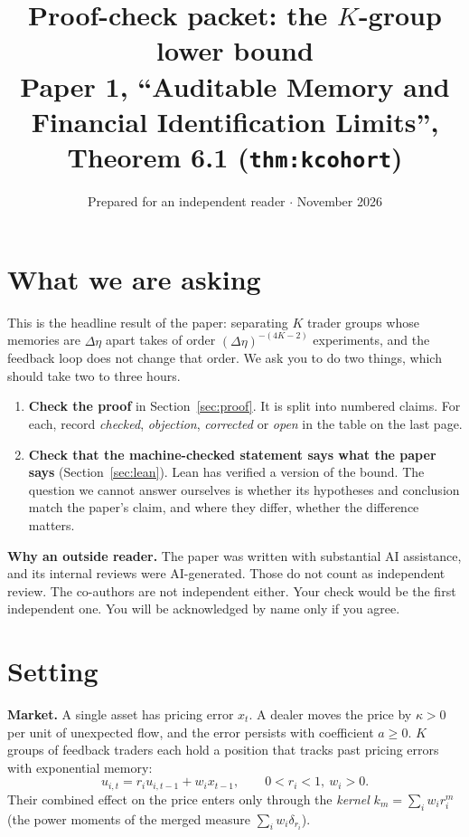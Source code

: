 \documentclass[11pt]{article}
\title{Proof-check packet: the $K$-group lower bound\\[2pt]\large Paper 1, ``Auditable Memory and Financial Identification Limits'', Theorem 6.1 (\texttt{thm:kcohort})}
\author{Prepared for an independent reader \quad$\cdot$\quad 8 November 2026}
\date{}
\begin{document}
\maketitle

\section*{What we are asking}

This is the headline result of the paper: separating $K$ trader groups whose memories are $\Delta\eta$ apart takes of order $(\Delta\eta)^{-(4K-2)}$ experiments, and the feedback loop does not change that order. We ask you to do two things, which should take two to three hours.

\begin{enumerate}[leftmargin=*]
\item \textbf{Check the proof} in Section~\ref{sec:proof}. It is split into numbered claims. For each, record \emph{checked}, \emph{objection}, \emph{corrected} or \emph{open} in the table on the last page.
\item \textbf{Check that the machine-checked statement says what the paper says} (Section~\ref{sec:lean}). Lean has verified a version of the bound. The question we cannot answer ourselves is whether its hypotheses and conclusion match the paper's claim, and where they differ, whether the difference matters.
\end{enumerate}

\textbf{Why an outside reader.} The paper was written with substantial AI assistance, and its internal reviews were AI-generated. Those do not count as independent review. The co-authors are not independent either. Your check would be the first independent one. You will be acknowledged by name only if you agree.

\section{Setting}

\textbf{Market.} A single asset has pricing error $x_t$. A dealer moves the price by $\kappa>0$ per unit of unexpected flow, and the error persists with coefficient $a\ge0$. $K$ groups of feedback traders each hold a position that tracks past pricing errors with exponential memory:
\[
u_{i,t}=r_iu_{i,t-1}+w_ix_{t-1},\qquad 0<r_i<1,\ w_i>0 .
\]
Their combined effect on the price enters only through the \emph{kernel} $k_m=\sum_iw_ir_i^m$ (the power moments of the merged measure $\sum_iw_i\delta_{r_i}$).
\end{document}
